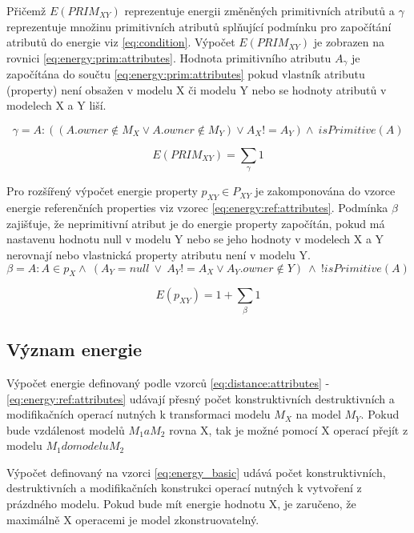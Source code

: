 \documentclass[11pt,twoside,a4paper]{book}
\begin{document}
Přičemž $E(PRIM_{XY})$ reprezentuje energii změněných primitivních atributů a
$\gamma$ reprezentuje množinu primitivních atributů splňující podmínku
 pro započítání atributů do energie viz \eqref{eq:condition}.
 Výpočet $E(PRIM_{XY})$ je zobrazen na rovnici
 \eqref{eq:energy:prim:attributes}. Hodnota primitivního atributu $A_\gamma$ je
 započítána do součtu \eqref{eq:energy:prim:attributes} pokud vlastník atributu
 (property) není obsažen v modelu X či modelu Y nebo se hodnoty atributů v
 modelech X a Y liší.

\begin{equation}\gamma=A: ((A.owner \notin M_{X} \vee A.owner \notin M_{Y})
\vee A_{X} != A_{Y}) \wedge \ isPrimitive(A)  \label{eq:condition}\end{equation}

\begin{equation}E(PRIM_{XY}) =
\sum_{\gamma}1
\label{eq:energy:prim:attributes}\end{equation}

Pro rozšířený výpočet energie property $p_{XY} \in P_{XY}$ je zakomponována do
vzorce energie referenčních properties viz vzorec
\ref{eq:energy:ref:attributes}. Podmínka $\beta$ zajišťuje, že
neprimitivní atribut je do energie property započítán, pokud má nastavenu
hodnotu null v modelu Y nebo se jeho hodnoty v modelech X a Y nerovnají nebo
vlastnická property atributu není v modelu Y.
\begin{equation}\beta = A :
A \in p_X \wedge \ (A_Y = null \ \vee \ A_Y != A_X \vee A_Y.owner \notin Y)\
\wedge \ !isPrimitive(A) \end{equation} 

\begin{equation}E(p_{XY}) = 1 + \sum_\beta
 1
 \label{eq:energy:ref:attributes}\end{equation}


\subsection{Význam energie}

Výpočet energie definovaný podle vzorců \eqref{eq:distance:attributes} -
\eqref{eq:energy:ref:attributes} udávají přesný počet konstruktivních
destruktivních a modifikačních operací nutných k transformaci modelu $M_X$ na
model $M_Y$. Pokud bude vzdálenost modelů $M_1 a M_2$
rovna X, tak je možné pomocí X operací přejít z modelu $M_1 do modelu M_2$

Výpočet definovaný na vzorci \eqref{eq:energy_basic} udává počet
konstruktivních, destruktivních a modifikačních konstrukci operací nutných k
vytvoření z prázdného modelu. Pokud bude mít energie hodnotu X, je zaručeno, že
maximálně X operacemi je model zkonstruovatelný.
\end{document}
